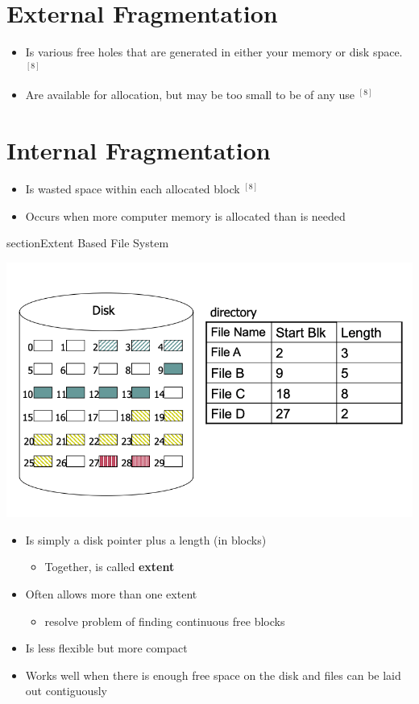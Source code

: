 \documentclass[12pt]{article}
\begin{document}
\section{External Fragmentation}

\begin{itemize}
    \item Is various free holes that are generated in either your
    memory or disk space. $^{[8]}$
    \item Are available for allocation, but may be too small to be of
    any use $^{[8]}$
\end{itemize}

\section{Internal Fragmentation}

\begin{itemize}
    \item Is wasted space within each allocated block $^{[8]}$
    \item Occurs when more computer memory is allocated than is needed
\end{itemize}

\*section{Extent Based File System}

\begin{center}
\includegraphics[width=\linewidth]{images/midterm_1_solution_14.png}
\end{center}

\begin{itemize}
    \item Is simply a disk pointer plus a length (in blocks)
    \begin{itemize}
        \item Together, is called \textbf{extent}
    \end{itemize}
    \item Often allows more than one extent
    \begin{itemize}
        \item resolve problem of finding continuous free blocks
    \end{itemize}
    \item Is less flexible but more compact
    \item Works well when there is enough free space on the disk and
    files can be laid out contiguously
\end{itemize}
\end{document}
